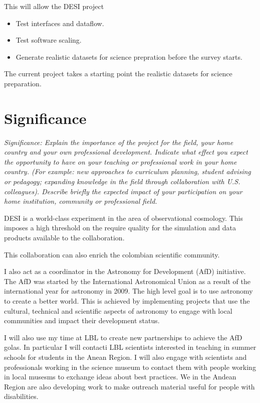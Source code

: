 \documentclass[12pt]{article}
\begin{document}
This will allow the DESI project 
\begin{itemize}
\item Test interfaces and dataflow.
\item Test software scaling.
\item Generate realistic datasets for science prepration before the
  survey starts.
\end{itemize}

The current project takes a starting point the realistic datasets for
science preparation. 

\section*{Significance}
\textit{Significance: Explain the importance of the project for the field,
your home country and your own professional development. Indicate
what effect you expect the opportunity to have on your teaching or
professional work in your home country. (For example: new approaches
to curriculum planning, student advising or pedagogy; expanding
knowledge in the field through collaboration with
U.S. colleagues). Describe briefly the expected impact of your
participation on your home institution, community or professional
field. }

DESI is a world-class experiment in the area of observational
cosmology. 
This imposes a high threshold on the require quality for the
simulation and data products available to the collaboration. 



This collaboration can also enrich the colombian scientific
community.




I also act as a coordinator in the Astronomy for Development (AfD)
initiative. The AfD was started by the International Astronomical
Union as a result of the international year for astronomy in 2009.
The high level goal is to use astronomy to create a better world. 
This is achieved by implementing projects that use the cultural,
technical and scientific aspects of astronomy to engage with local
communities and impact their development status. 

I will also use my time at LBL to create new partnerships to achieve
the AfD golas. In particular I will contacti LBL scientists interested in
teaching in summer schools for students in the Anean Region. I will
also engage with scientists and professionals working in the science
museum to contact them with people working in local musesms to
exchange ideas about best practices. We in the Andean Region are also
developing work to make outreach material useful for people with
disabilities. 
\end{document}
